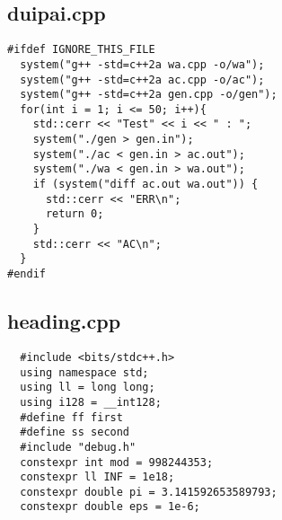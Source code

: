 \documentclass[UTF8, a4paper, titlepage, twoside]{ctexart}
\begin{document}
\subsection{duipai.cpp}
\begin{verbatim}
#ifdef IGNORE_THIS_FILE
  system("g++ -std=c++2a wa.cpp -o/wa");
  system("g++ -std=c++2a ac.cpp -o/ac");
  system("g++ -std=c++2a gen.cpp -o/gen");
  for(int i = 1; i <= 50; i++){
    std::cerr << "Test" << i << " : ";
    system("./gen > gen.in");
    system("./ac < gen.in > ac.out");
    system("./wa < gen.in > wa.out");
    if (system("diff ac.out wa.out")) {
      std::cerr << "ERR\n";
      return 0;
    }
    std::cerr << "AC\n";
  }
#endif  
\end{verbatim}

\subsection{heading.cpp}
\begin{verbatim}
  #include <bits/stdc++.h>
  using namespace std;
  using ll = long long;
  using i128 = __int128;
  #define ff first
  #define ss second
  #include "debug.h"
  constexpr int mod = 998244353;
  constexpr ll INF = 1e18;
  constexpr double pi = 3.141592653589793;
  constexpr double eps = 1e-6;


\end{verbatim}

\clearpage
\end{document}
